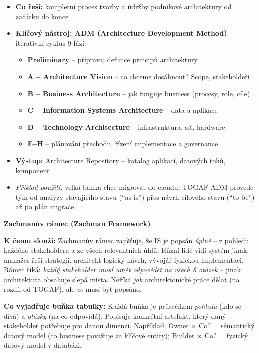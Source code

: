 \begin{itemize}
  \item \textbf{Co řeší:} kompletní proces tvorby a údržby podnikové architektury od začátku do konce
  \item \textbf{Klíčový nástroj: ADM (Architecture Development Method)} -- iterativní cyklus 9 fází:
    \begin{itemize}
      \item \textbf{Preliminary} -- příprava; definice principů architektury
      \item \textbf{A -- Architecture Vision} -- co chceme dosáhnout? Scope, stakeholdeři
      \item \textbf{B -- Business Architecture} -- jak funguje business (procesy, role, cíle)
      \item \textbf{C -- Information Systems Architecture} -- data a aplikace
      \item \textbf{D -- Technology Architecture} -- infrastruktura, síť, hardware
      \item \textbf{E--H} -- plánování přechodu, řízení implementace a governance
    \end{itemize}
  \item \textbf{Výstup:} Architecture Repository -- katalog aplikací, datových toků, komponent
  \item \textit{Příklad použití:} velká banka chce migrovat do cloudu; TOGAF ADM provede
    tým od analýzy stávajícího stavu (``as-is'') přes návrh cílového stavu (``to-be'')
    až po plán migrace
\end{itemize}

\textbf{Zachmanův rámec (Zachman Framework)}

\textbf{K čemu slouží:} Zachmanův rámec zajišťuje, že IS je popsán \textit{úplně} -- z pohledu každého stakeholdera a ze všech relevantních úhlů.
Různí lidé vidí systém jinak: manažer řeší strategii, architekt logický návrh, vývojář fyzickou implementaci.
Rámec říká: \textit{každý stakeholder musí umět odpovědět na všech 6 otázek} -- jinak architektura obsahuje slepá místa.
Neříká \textit{jak} architektonické práce dělat (na rozdíl od TOGAF), ale \textit{co} musí být popsáno.

\textbf{Co vyjadřuje buňka tabulky:} Každá buňka je průsečíkem \textit{pohledu} (kdo se dívá) a \textit{otázky} (na co odpovídá).
Popisuje konkrétní artefakt, který daný stakeholder potřebuje pro danou dimenzi.
Například: Owner $\times$ Co? = sémantický datový model (co business považuje za klíčové entity); Builder $\times$ Co? = fyzický datový model v databázi.

